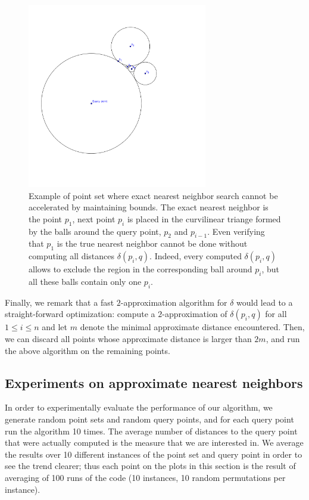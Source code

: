 \documentclass[a4paper,USenglish]{socg-lipics-v2018}
\newcommand{\dist}{\delta}
\begin{document}
\begin{figure}[ht]
    \includegraphics[width=0.7\textwidth]{pics/exact_bad_example.png}
    \caption{Example of point set where exact nearest neighbor search cannot be accelerated by maintaining bounds.
    The exact nearest neighbor is the point $p_1$, next point $p_i$ is placed 
    in the curvilinear triange formed by the balls around the query point, $p_2$ and $p_{i-1}$. Even verifying that $p_1$
    is the true nearest neighbor cannot be done without computing all distances $\dist(p_i,q)$. Indeed, every computed
    $\dist(p_i,q)$ allows to exclude the region in the corresponding ball around $p_i$, but all these balls contain only one $p_i$.}
    \label{fig:exact_bad_example}
\end{figure}



Finally, we remark that a fast $2$-approximation algorithm for $\dist$ would lead to a straight-forward
optimization: compute a $2$-approximation of $\dist(p_i,q)$ for all $1\leq i\leq n$
and let $m$ denote the minimal approximate distance encountered. Then, we can discard all points
whose approximate distance is larger than $2m$, and run the above algorithm on the remaining points.

\subsection{Experiments on approximate nearest neighbors}

In order to experimentally evaluate the performance of our algorithm,
we generate random point sets and random query points, and for each query point
run the algorithm 10 times. The average number of distances to the query point
that were actually computed is the measure that we are interested in.
We average the results over 10 different instances of the point
set and query point in order to see the trend clearer; thus
each point on the plots in this section is the result of averaging of 100 runs
of the code (10 instances, 10 random permutations per instance).
\end{document}

